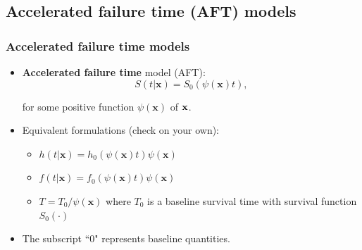 \documentclass{beamer}
\newenvironment{wideitemize}%
  {\begin{itemize}%
    \setlength{\parskip}{1em}}%
  {\end{itemize}}
\newcommand{\currentsubsection}{}
\let\oldsubsection\subsection
\renewcommand{\subsection}[1]{\oldsubsection{#1}\renewcommand{\currentsubsection}{#1}}
\begin{document}
\subsection{Accelerated failure time  (AFT) models} 
\begin{frame} \frametitle{Accelerated failure time models}
\begin{wideitemize}
\item
{\bf Accelerated failure time} model (AFT):
\[S(t|\mathbf{x})=S_0(\psi(\mathbf{x})t),\]

for some positive function $\psi(\mathbf{x})$ of  $\bf x$. 

\item  Equivalent formulations (check on your own):

\begin{wideitemize}
\item $h(t|\mathbf{x})=h_0(\psi(\mathbf{x})t)\psi(\mathbf{x})$

\item $f(t|\mathbf{x})=f_0(\psi(\mathbf{x})t)\psi(\mathbf{x})$


\item  $T = T_0/\psi(\mathbf{x})$ where $T_0$ is a baseline survival time  with survival function $S_0(\cdot)$



\end{wideitemize}

\item The subscript ``0"  represents baseline quantities.


\end{wideitemize}

\end{frame}
\end{document}
